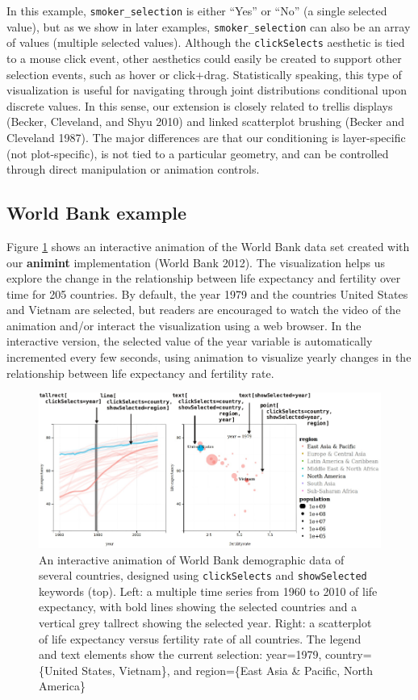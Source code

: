 \documentclass[12pt,]{article}
\theoremstyle{definition}
\theoremstyle{definition}
\theoremstyle{definition}
\theoremstyle{remark}
\begin{document}
In this example, \texttt{smoker\_selection} is either ``Yes'' or ``No''
(a single selected value), but as we show in later examples,
\texttt{smoker\_selection} can also be an array of values (multiple
selected values). Although the \texttt{clickSelects} aesthetic is tied
to a mouse click event, other aesthetics could easily be created to
support other selection events, such as hover or click+drag.
Statistically speaking, this type of visualization is useful for
navigating through joint distributions conditional upon discrete values.
In this sense, our extension is closely related to trellis displays
(Becker, Cleveland, and Shyu 2010) and linked scatterplot brushing
(Becker and Cleveland 1987). The major differences are that our
conditioning is layer-specific (not plot-specific), is not tied to a
particular geometry, and can be controlled through direct manipulation
or animation controls.

\hypertarget{worldbank}{%
\subsection{World Bank example}\label{worldbank}}

Figure \ref{fig:worldbank} shows an interactive animation of the World
Bank data set created with our \textbf{animint} implementation (World
Bank 2012). The visualization helps us explore the change in the
relationship between life expectancy and fertility over time for 205
countries. By default, the year 1979 and the countries United States and
Vietnam are selected, but readers are encouraged to watch the video of
the animation and/or interact the visualization using a web browser. In
the interactive version, the selected value of the year variable is
automatically incremented every few seconds, using animation to
visualize yearly changes in the relationship between life expectancy and
fertility rate.

\begin{figure}
\centering
\includegraphics{images/figure-1}
\caption{\label{fig:worldbank}An interactive animation of World Bank
demographic data of several countries, designed using
\texttt{clickSelects} and \texttt{showSelected} keywords (top). Left: a
multiple time series from 1960 to 2010 of life expectancy, with bold
lines showing the selected countries and a vertical grey tallrect
showing the selected year. Right: a scatterplot of life expectancy
versus fertility rate of all countries. The legend and text elements
show the current selection: year=1979, country=\{United States,
Vietnam\}, and region=\{East Asia \& Pacific, North America\}}
\end{figure}
\end{document}
